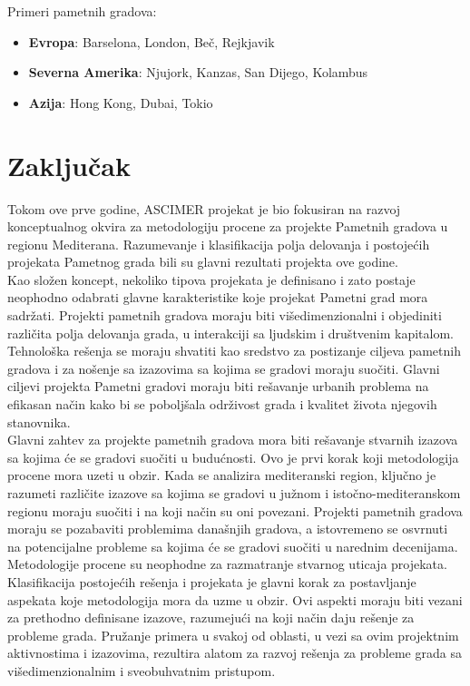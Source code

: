 \documentclass[a4paper,12pt]{article}
\begin{document}
{Primeri pametnih gradova:
\begin{itemize}
\item \textbf{Evropa}: Barselona, London, Beč, Rejkjavik
\item \textbf{Severna Amerika}: Njujork, Kanzas, San Dijego, Kolambus
\item \textbf{Azija}: Hong Kong, Dubai, Tokio
\end{itemize} 

\appendix
\section{Zaključak}
\label{sec:zakljucak}
Tokom ove prve godine, ASCIMER projekat je bio fokusiran na razvoj konceptualnog okvira za metodologiju procene za projekte Pametnih gradova u regionu Mediterana. Razumevanje i klasifikacija polja delovanja i postojećih projekata Pametnog grada bili su glavni rezultati projekta ove godine. \\

Kao složen koncept, nekoliko tipova projekata je definisano i zato postaje neophodno odabrati glavne karakteristike koje projekat Pametni grad mora sadržati. Projekti pametnih gradova moraju biti višedimenzionalni i objediniti različita polja delovanja grada, u interakciji sa ljudskim i društvenim kapitalom. Tehnološka rešenja se moraju shvatiti kao sredstvo za postizanje ciljeva pametnih gradova i za nošenje sa izazovima sa kojima se gradovi moraju suočiti. Glavni ciljevi projekta Pametni gradovi moraju biti rešavanje urbanih problema na efikasan način kako bi se poboljšala održivost grada i kvalitet života njegovih stanovnika.  \\

Glavni zahtev za projekte pametnih gradova mora biti rešavanje stvarnih izazova sa kojima će se gradovi suočiti u budućnosti. Ovo je prvi korak koji metodologija procene mora uzeti u obzir. Kada se analizira mediteranski region, ključno je razumeti različite izazove sa kojima se gradovi u južnom i istočno-mediteranskom regionu moraju suočiti i na koji način su oni povezani. Projekti pametnih gradova moraju se pozabaviti problemima današnjih gradova, a istovremeno se osvrnuti na potencijalne probleme sa kojima će se gradovi suočiti u narednim decenijama. \\

Metodologije procene su neophodne za razmatranje stvarnog uticaja projekata. Klasifikacija postojećih rešenja i projekata je glavni korak za postavljanje aspekata koje metodologija mora da uzme u obzir. Ovi aspekti moraju biti vezani za prethodno definisane izazove, razumejući na koji način daju rešenje za probleme grada. Pružanje primera u svakoj od oblasti, u vezi sa ovim projektnim aktivnostima i izazovima, rezultira alatom za razvoj rešenja za probleme grada sa višedimenzionalnim i sveobuhvatnim pristupom. \\

}
\end{document}
